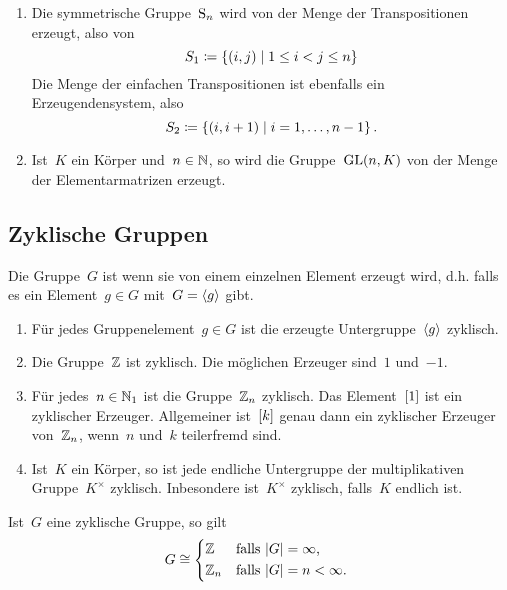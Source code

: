 \begin{example}
  \leavevmode
  \begin{enumerate}
    \item
      Die symmetrische Gruppe~$\operatorname{S}_n$ wird von der Menge der Transpositionen erzeugt, also von
      \[
        S_1
        \defined
        \{
          (i, j)
        \suchthat
          1 \leq i < j \leq n
        \}
      \]
      Die Menge der einfachen Transpositionen ist ebenfalls ein Erzeugendensystem, also
      \[
        S_2
        \defined
        \{
          (i, i+1)
        \suchthat
          i = 1, \dotsc, n-1
        \} \,.
      \]
    \item
      Ist~$K$ ein Körper und~$n \in \mathbb{N}$, so wird die Gruppe~$\operatorname{GL}(n,K)$ von der Menge der Elementarmatrizen erzeugt.
  \end{enumerate}
\end{example}


\subsection{Zyklische Gruppen}

\begin{definition}
  Die Gruppe~$G$ ist  wenn sie von einem einzelnen Element erzeugt wird, d.h. falls es ein Element~$g \in G$ mit~$G = \langle g\rangle$ gibt.
\end{definition}

\begin{example}
  \leavevmode
  \begin{enumerate}
    \item
      Für jedes Gruppenelement~$g \in G$ ist die erzeugte Untergruppe~$\langle g\rangle$ zyklisch.
    \item
      Die Gruppe~$\mathbb{Z}$ ist zyklisch.
      Die möglichen Erzeuger sind~$1$ und~$-1$.
    \item
      Für jedes~$n \in \mathbb{N}_1$ ist die Gruppe~$\mathbb{Z}_n$ zyklisch.
      Das Element~$[1]$ ist ein zyklischer Erzeuger.
      Allgemeiner ist~$[k]$ genau dann ein zyklischer Erzeuger von~$\mathbb{Z}_n$, wenn~$n$ und~$k$ teilerfremd sind.
    \item
      Ist~$K$ ein Körper, so ist jede endliche Untergruppe der multiplikativen Gruppe~$K^\times$ zyklisch.
      Inbesondere ist~$K^\times$ zyklisch, falls~$K$ endlich ist.
  \end{enumerate}
\end{example}

\begin{theorem}
  Ist~$G$ eine zyklische Gruppe, so gilt
  \[
    G
    \cong
    \begin{cases*}
        \Integer
        &
        falls~$\card{G} = \infty$,
        \\
        \Integer_n
        &
        falls~$\card{G} = n < \infty$.
    \end{cases*}
  \]
\end{theorem}


